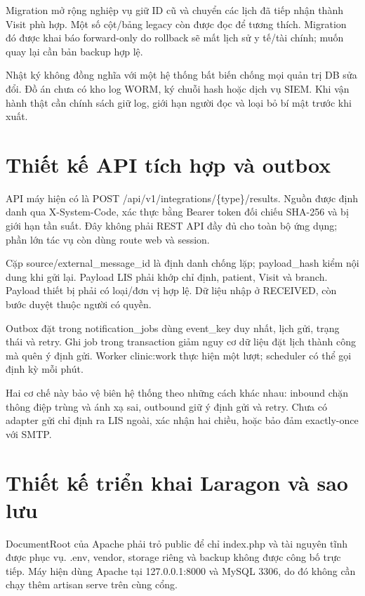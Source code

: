 Migration mở rộng nghiệp vụ giữ ID cũ và chuyển các lịch đã tiếp nhận thành Visit phù hợp.\allowbreak{} Một số cột/\allowbreak{}bảng legacy còn được đọc để tương thích.\allowbreak{} Migration đó được khai báo forward-only do rollback sẽ mất lịch sử y tế/\allowbreak{}tài chính; muốn quay lại cần bản backup hợp lệ.\allowbreak{}

Nhật ký không đồng nghĩa với một hệ thống bất biến chống mọi quản trị DB sửa đổi.\allowbreak{} Đồ án chưa có kho log WORM, ký chuỗi hash hoặc dịch vụ SIEM.\allowbreak{} Khi vận hành thật cần chính sách giữ log, giới hạn người đọc và loại bỏ bí mật trước khi xuất.\allowbreak{}


\section{Thiết kế API tích hợp và outbox}
API máy hiện có là POST /\allowbreak{}api/\allowbreak{}v1/\allowbreak{}integrations/\allowbreak{}\{type\}/\allowbreak{}results.\allowbreak{} Nguồn được định danh qua X-System-Code, xác thực bằng Bearer token đối chiếu SHA-256 và bị giới hạn tần suất.\allowbreak{} Đây không phải REST API đầy đủ cho toàn bộ ứng dụng; phần lớn tác vụ còn dùng route web và session.\allowbreak{}

Cặp source/\allowbreak{}external\_\allowbreak{}message\_\allowbreak{}id là định danh chống lặp; payload\_\allowbreak{}hash kiểm nội dung khi gửi lại.\allowbreak{} Payload LIS phải khớp chỉ định, patient, Visit và branch.\allowbreak{} Payload thiết bị phải có loại/\allowbreak{}đơn vị hợp lệ.\allowbreak{} Dữ liệu nhập ở RECEIVED, còn bước duyệt thuộc người có quyền.\allowbreak{}

Outbox đặt trong notification\_\allowbreak{}jobs dùng event\_\allowbreak{}key duy nhất, lịch gửi, trạng thái và retry.\allowbreak{} Ghi job trong transaction giảm nguy cơ dữ liệu đặt lịch thành công mà quên ý định gửi.\allowbreak{} Worker clinic:\allowbreak{}work thực hiện một lượt; scheduler có thể gọi định kỳ mỗi phút.\allowbreak{}

Hai cơ chế này bảo vệ biên hệ thống theo những cách khác nhau:\allowbreak{} inbound chặn thông điệp trùng và ánh xạ sai, outbound giữ ý định gửi và retry.\allowbreak{} Chưa có adapter gửi chỉ định ra LIS ngoài, xác nhận hai chiều, hoặc bảo đảm exactly-once với SMTP.\allowbreak{}


\section{Thiết kế triển khai Laragon và sao lưu}
Document\allowbreak{}Root của Apache phải trỏ public để chỉ index.\allowbreak{}php và tài nguyên tĩnh được phục vụ.\allowbreak{} .\allowbreak{}env, vendor, storage riêng và backup không được công bố trực tiếp.\allowbreak{} Máy hiện dùng Apache tại 127.\allowbreak{}0.\allowbreak{}0.\allowbreak{}1:\allowbreak{}8000 và My\allowbreak{}SQL 3306, do đó không cần chạy thêm artisan serve trên cùng cổng.\allowbreak{}

